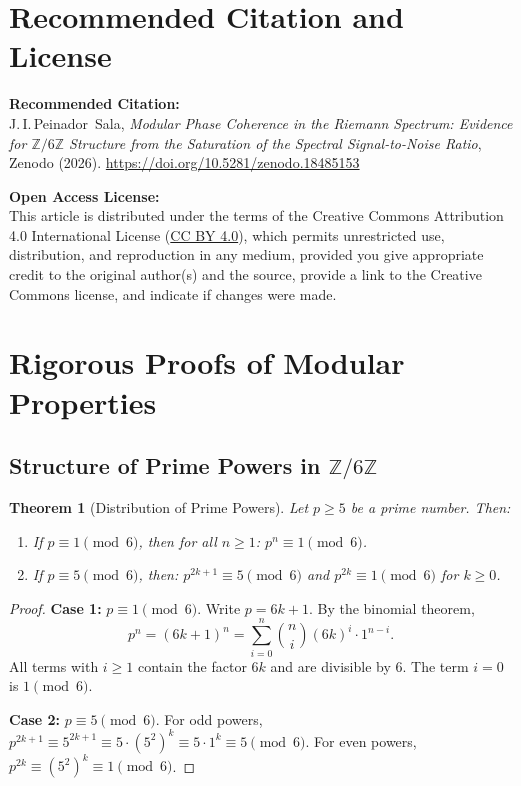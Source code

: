 \documentclass[12pt,a4paper]{article}
\theoremstyle{plain}
\newtheorem{theorem}{Theorem}[section]
\theoremstyle{definition}
\theoremstyle{remark}
\begin{document}
\section*{Recommended Citation and License}

\noindent\textbf{Recommended Citation:} \\
J.\,I.\,Peinador~Sala, \emph{Modular Phase Coherence in the Riemann Spectrum: Evidence for \(\mathbb{Z}/6\mathbb{Z}\) Structure from the Saturation of the Spectral Signal-to-Noise Ratio}, Zenodo (2026). \url{https://doi.org/10.5281/zenodo.18485153}

\vspace{1em}
\noindent\textbf{Open Access License:} \\
This article is distributed under the terms of the Creative Commons Attribution 4.0 International License (\href{https://creativecommons.org/licenses/by/4.0/}{CC BY 4.0}), which permits unrestricted use, distribution, and reproduction in any medium, provided you give appropriate credit to the original author(s) and the source, provide a link to the Creative Commons license, and indicate if changes were made.

\appendix
\section{Rigorous Proofs of Modular Properties}
\label{app:modular_proofs}

\subsection{Structure of Prime Powers in \(\mathbb{Z}/6\mathbb{Z}\)}

\begin{theorem}[Distribution of Prime Powers]
\label{thm:prime_powers}
Let \(p \geq 5\) be a prime number. Then:
\begin{enumerate}
    \item If \(p \equiv 1 \pmod{6}\), then for all \(n \geq 1\): \(p^n \equiv 1 \pmod{6}\).
    \item If \(p \equiv 5 \pmod{6}\), then: \(p^{2k+1} \equiv 5 \pmod{6}\) and \(p^{2k} \equiv 1 \pmod{6}\) for \(k \geq 0\).
\end{enumerate}
\end{theorem}

\begin{proof}
\textbf{Case 1:} \(p \equiv 1 \pmod{6}\). Write \(p = 6k+1\). By the binomial theorem,
\[
p^n = (6k+1)^n = \sum_{i=0}^n \binom{n}{i} (6k)^i \cdot 1^{n-i}.
\]
All terms with \(i \geq 1\) contain the factor \(6k\) and are divisible by 6. The term \(i=0\) is \(1 \pmod{6}\).

\textbf{Case 2:} \(p \equiv 5 \pmod{6}\). For odd powers, \(p^{2k+1} \equiv 5^{2k+1} \equiv 5 \cdot (5^2)^k \equiv 5 \cdot 1^k \equiv 5 \pmod{6}\). For even powers, \(p^{2k} \equiv (5^2)^k \equiv 1 \pmod{6}\).
\end{proof}
\end{document}
